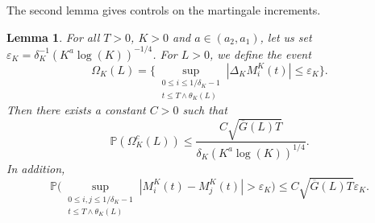 \documentclass[JEP,XML,SOM,Unicode,published]{cedram}
\theoremstyle{plain}
\newtheorem{lemma}[theorem]{Lemma}
\theoremstyle{remark}
\begin{document}
The second lemma gives controls on the martingale increments.

\begin{lemma}
\label{corol:accrM}
For all $T>0$, $K>0$ and $a\in (a_2,a_1)$, let us set $\varepsilon_{K}= \delta_K^{-1}(K^{a}\log(K))^{-1/4}$. For $L>0$, we define the event
\begin{equation}
\Omega_{K}(L)=\biggl\{\sup_{\substack{0\leq i\leq 1/\delta_K-1\\ t\le T\wedge \theta_K(L)}} |\Delta_KM^K_{i}(t)| \le \varepsilon_{K}\biggr\}.\label{event:OmegaK}
\end{equation}
Then there exists a constant $C>0$ such that
\begin{equation}
\label{eq:estim-Omega}
\mathbb{P}(\Omega_K^c(L))
\leq \frac{C\sqrt{\overline{G}(L)T}}{\delta_K (K^a
\log(K))^{1/4}} .
\end{equation}
In addition,
\begin{equation}
\label{eq:borne-martingale-simple}
\mathbb{P} \biggl(\sup_{\substack{0\leq i,j\leq 1/\delta_K-1\\ t\le T\wedge \theta_K(L)}}\left|M^K_i(t)-M^K_j(t)\right|>\varepsilon_K \biggr)\leq C\sqrt{\overline{G}(L)T}
\varepsilon_K.
\end{equation}
\end{lemma}
\end{document}
